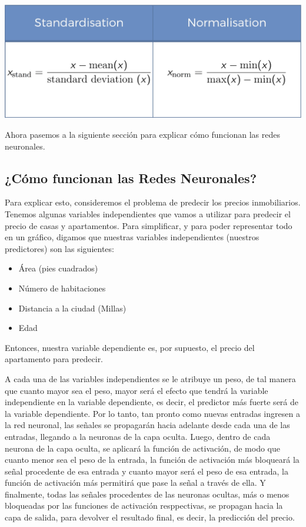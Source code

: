 \documentclass[]{book}
\providecommand{\tightlist}{%
  \setlength{\itemsep}{0pt}\setlength{\parskip}{0pt}}
\begin{document}
\includegraphics{Images/ANN_16.png}

Ahora pasemos a la siguiente sección para explicar cómo funcionan las redes neuronales.

\hypertarget{cuxf3mo-funcionan-las-redes-neuronales}{%
\subsection{¿Cómo funcionan las Redes Neuronales?}\label{cuxf3mo-funcionan-las-redes-neuronales}}

Para explicar esto, consideremos el problema de predecir los precios inmobiliarios. Tenemos algunas variables independientes que vamos a utilizar para predecir el precio de casas y apartamentos. Para simplificar, y para poder representar todo en un gráfico, digamos que nuestras variables independientes (nuestros predictores) son las siguientes:

\begin{itemize}
\tightlist
\item
  Área (pies cuadrados)
\item
  Número de habitaciones
\item
  Distancia a la ciudad (Millas)
\item
  Edad
\end{itemize}

Entonces, nuestra variable dependiente es, por supuesto, el precio del apartamento para predecir.

A cada una de las variables independientes se le atribuye un peso, de tal manera que cuanto mayor sea el peso, mayor será el efecto que tendrá la variable independiente en la variable dependiente, es decir, el predictor más fuerte será de la variable dependiente. Por lo tanto, tan pronto como nuevas entradas ingresen a la red neuronal, las señales se propagarán hacia adelante desde cada una de las entradas, llegando a la neuronas de la capa oculta. Luego, dentro de cada neurona de la capa oculta, se aplicará la función de activación, de modo que cuanto menor sea el peso de la entrada, la función de activación más bloqueará la señal procedente de esa entrada y cuanto mayor será el peso de esa entrada, la función de activación más permitirá que pase la señal a través de ella. Y finalmente, todas las señales procedentes de las neuronas ocultas, más o menos bloqueadas por las funciones de activación resppectivas, se propagan hacia la capa de salida, para devolver el resultado final, es decir, la predicción del precio.
\end{document}
